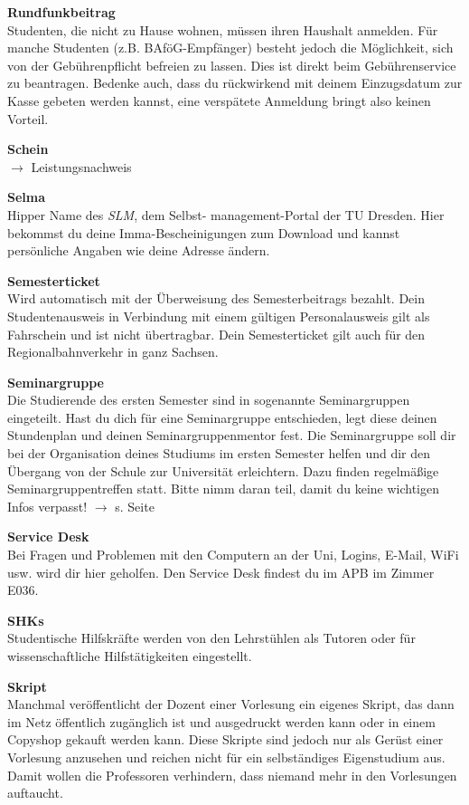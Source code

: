 \begin{multicols}{2}
\textbf{Rundfunkbeitrag} \\
Studenten, die nicht zu Hause wohnen, müssen ihren Haushalt anmelden.
Für manche Studenten (z.B. BAföG-Empfänger) besteht jedoch die Möglichkeit, sich von der Gebührenpflicht befreien zu lassen.
Dies ist direkt beim Gebührenservice zu beantragen.
Bedenke auch, dass du rückwirkend mit deinem Einzugsdatum zur Kasse gebeten werden kannst, eine verspätete Anmeldung bringt also keinen Vorteil.

\vfill\columnbreak

\textbf{Schein} \\
$\rightarrow$ Leistungsnachweis

\textbf{Selma} \\
Hipper Name des \textit{SLM}, dem Selbst- management-Portal der TU Dresden.
Hier bekommst du deine Imma-Bescheinigungen zum Download und kannst persönliche Angaben wie deine Adresse ändern. 

\textbf{Semesterticket} \\
Wird automatisch mit der Überweisung des Semesterbeitrags bezahlt.
Dein Studentenausweis in Verbindung mit einem gültigen Personalausweis gilt als Fahrschein und ist nicht übertragbar.
Dein Semesterticket gilt auch für den Regionalbahnverkehr in ganz Sachsen.

\textbf{Seminargruppe} \\
Die Studierende des ersten Semester sind in sogenannte Seminargruppen eingeteilt. Hast du dich für eine Seminargruppe entschieden, legt diese deinen Stundenplan und deinen Seminargruppenmentor fest. Die Se\-mi\-nar\-grup\-pe soll dir bei der Organisation deines Studiums im ersten Semester helfen und dir den Übergang von der Schule zur Universität erleichtern. Dazu finden regelmäßige Seminargruppentreffen statt. Bitte nimm daran teil, damit du keine wichtigen Infos verpasst!
$\rightarrow$ s. Seite \pageref{sec:seminargruppen}

\textbf{Service Desk} \\
Bei Fragen und Problemen mit den Computern an der Uni, Logins, E-Mail, WiFi usw. wird dir hier geholfen. Den Service Desk findest du im APB im Zimmer E036.

\textbf{SHKs} \\
Studentische Hilfskräfte werden von den Lehrstühlen als Tutoren oder für wissenschaftliche Hilfstätigkeiten eingestellt.

\textbf{Skript} \\
Manchmal veröffentlicht der Dozent einer Vorlesung ein eigenes Skript, das dann im Netz öffentlich zugänglich ist und ausgedruckt werden kann oder in einem Copyshop gekauft werden kann.
Diese Skripte sind jedoch nur als Gerüst einer Vorlesung anzusehen und reichen nicht für ein selbständiges Eigenstudium aus.
Damit wollen die Professoren verhindern, dass niemand mehr in den Vorlesungen auftaucht.


\end{multicols}
